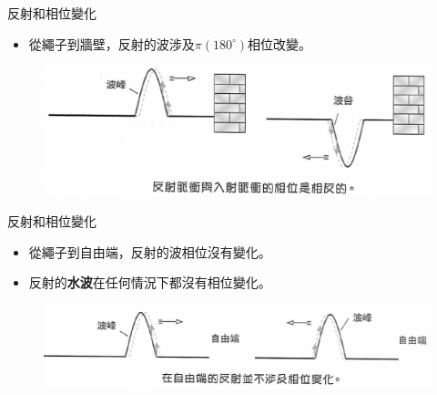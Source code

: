 \documentclass[13pt]{beamer}
\begin{document}
\begin{frame}{反射和相位變化}
    \begin{itemize}
        \item 從繩子到牆壁，反射的波涉及$\pi(180^\circ)$相位改變。
    \end{itemize}\bigskip
    \begin{figure}
        \centering
        \includegraphics[width=\linewidth]{images/Screenshot 2023-09-27 at 7.11.55 PM.png}
        \label{fig:enter-label}
    \end{figure}
\end{frame}

\begin{frame}{反射和相位變化}
    \begin{itemize}
        \item 從繩子到自由端，反射的波相位沒有變化。
        \item 反射的\textbf{水波}在任何情況下都沒有相位變化。
    \end{itemize}\bigskip
    \begin{figure}
        \centering
        \includegraphics[width=1\linewidth]{images/Screenshot 2023-09-27 at 7.12.02 PM.png}


    \end{figure}

\end{frame}
\end{document}

